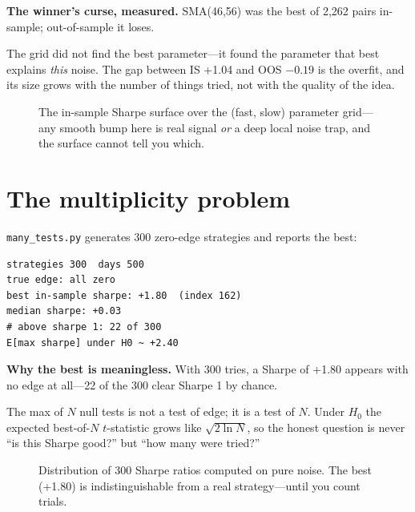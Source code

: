 \begin{example}\label{ex:isoos}
\textbf{The winner's curse, measured.} SMA(46,56) was the best of 2{,}262 pairs in-sample;
out-of-sample it loses.
\begin{solution}
The grid did not find the best parameter---it found the parameter that best explains
\emph{this} noise. The gap between IS +1.04 and OOS $-0.19$ is the overfit, and its size
grows with the number of things tried, not with the quality of the idea.
\end{solution}
\end{example}

\begin{figure}[htbp]\centering

\caption{The in-sample Sharpe surface over the (fast, slow) parameter grid---any smooth
bump here is real signal \emph{or} a deep local noise trap, and the surface cannot tell
you which.}
\label{fig:grid}
\end{figure}

\section{The multiplicity problem}\label{sec:mult}

\texttt{many\_tests.py} generates 300 zero-edge strategies and reports the best:
\begin{lstlisting}[numbers=none]
strategies 300  days 500
true edge: all zero
best in-sample sharpe: +1.80  (index 162)
median sharpe: +0.03
# above sharpe 1: 22 of 300
E[max sharpe] under H0 ~ +2.40
\end{lstlisting}

\begin{example}\label{ex:max}
\textbf{Why the best is meaningless.} With 300 tries, a Sharpe of +1.80 appears with no
edge at all---22 of the 300 clear Sharpe 1 by chance.
\begin{solution}
The max of $N$ null tests is not a test of edge; it is a test of $N$. Under $H_0$ the
expected best-of-$N$ $t$-statistic grows like $\sqrt{2\ln N}$, so the honest question is
never ``is this Sharpe good?'' but ``how many were tried?''
\end{solution}
\end{example}

\begin{figure}[htbp]\centering

\caption{Distribution of 300 Sharpe ratios computed on pure noise. The best (+1.80) is
indistinguishable from a real strategy---until you count trials.}
\label{fig:shist}
\end{figure}

